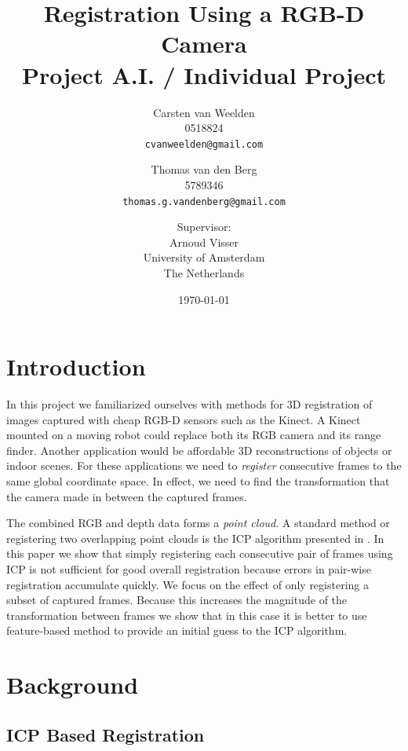 \documentclass[a4paper]{article}
\title{Registration Using a RGB-D Camera\\
{\large Project A.I. / Individual Project}}
\author{Carsten van Weelden \\ 0518824 \\ \texttt{cvanweelden@gmail.com} \and Thomas van den Berg \\ 5789346 \\ \texttt{thomas.g.vandenberg@gmail.com} \and
 \small{Supervisor:} \\ Arnoud Visser \\ University of Amsterdam\\
  The Netherlands}
\date{\today}
\begin{document}
\maketitle

\section{Introduction}

In this project we familiarized ourselves with methods for 3D registration of images captured with cheap RGB-D sensors such as the Kinect. A Kinect mounted on a moving robot could replace both its RGB camera and its range finder. Another application would be affordable 3D reconstructions of objects or indoor scenes. For these applications we need to \emph{register} consecutive frames to the same global coordinate space. In effect, we need to find the transformation that the camera made in between the captured frames. %



The combined RGB and depth data forms a \emph{point cloud}. A standard method or registering two overlapping point clouds is the \ac{ICP} algorithm presented in \cite{besl1992method}. In this paper we show that simply registering each consecutive pair of frames using \ac{ICP} is not sufficient for good overall registration because errors in pair-wise registration accumulate quickly. We focus on the effect of only registering a subset of captured frames. Because this increases the magnitude of the transformation between frames we show that in this case it is better to use feature-based method to provide an initial guess to the \ac{ICP} algorithm.

\section{Background}

\subsection{ICP Based Registration}
\end{document}
